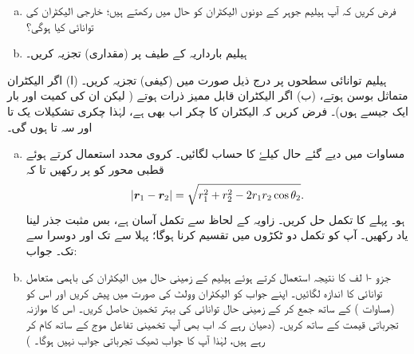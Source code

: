 \begin{enumerate}[a.]
\item
فرض کریں کہ آپ ہیلیم جوہر کے دونوں الیکٹران کو  حال میں رکھتے ہیں؛ خارجی الیکٹران کی توانائی کیا ہوگی؟
\item
ہیلیم بارداریہ  کے طیف پر (مقداری) تجزیہ کریں۔ 
\end{enumerate}
ہیلیم توانائی سطحوں پر درج ذیل صورت میں (کیفی) تجزیہ کریں۔ (ا) اگر الیکٹران متماثل بوسن ہوتے، (ب) اگر الیکٹران قابل ممیز ذرات ہوتے ( لیکن ان کی کمیت اور بار ایک جیسے ہوں)۔ فرض کریں کہ الیکٹران کا چکر اب بھی  ہے، لہٰذا چکری تشکیلات یک تا اور سہ تا ہوں گی۔
\begin{enumerate}[a.]
\item
مساوات  میں دیے گئے حال  کیلۓ  کا حساب لگائیں۔  کروی محدد استعمال کرتے ہوئے قطبی محور کو  پر رکھیں تا کہ
\begin{align*}
|{{\boldsymbol{r}}}_{1}-{{\boldsymbol{r}}}_{2}|= \sqrt{r_1^2+ r_2^2 -2r_{1} r_{2}\cos\theta_{2}}.
\end{align*}
ہو۔ پہلے  کا تکمل حل کریں۔ زاویہ  کے لحاظ سے تکمل آسان ہے، بس مثبت جذر لینا یاد رکھیں۔ آپ کو  تکمل دو ٹکڑوں میں تقسیم کرنا ہوگا؛ پہلا سے  تک اور دوسرا  سے  تک۔ جواب:  
\item
جزو -ا لف کا نتیجہ استعمال کرتے ہوئے ہیلیم کے زمینی حال میں الیکٹران کی باہمی متعامل توانائی کا اندازہ لگائیں۔ اپنے جواب کو الیکٹران وولٹ کی صورت میں پیش کریں اور اس کو  (مساوات ) کے ساتھ جمع کر کے زمینی حال توانائی کی بہتر تخمین حاصل کریں۔ اس کا موازنہ تجرباتی قیمت کے ساتھ کریں۔ (دھیان رہے کہ اب بھی آپ تخمینی تفاعل موج کے ساتھ کام کر رہے ہیں، لہٰذا آپ کا جواب ٹھیک تجرباتی جواب نہیں ہوگا۔ )
\end{enumerate}


